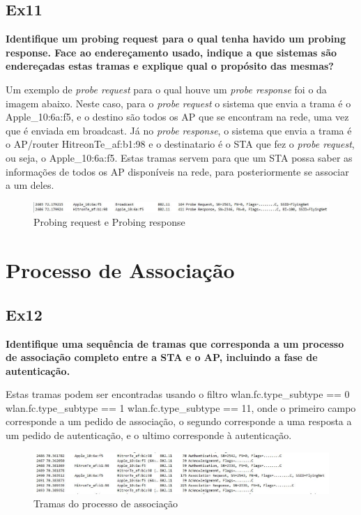 \documentclass{article}
\begin{document}
\subsection{Ex11}
\textbf{Identifique um probing request para o qual tenha havido um probing response. Face ao endereçamento usado, indique a que sistemas são endereçadas estas tramas e explique qual o propósito das mesmas?}\\\par
Um exemplo de \textit{probe request} para o qual houve um \textit{probe response} foi o da imagem abaixo. Neste caso, para o \textit{probe request} o sistema que envia a trama é o Apple\_10:6a:f5, e o destino são todos os AP que se encontram na rede, uma vez que é enviada em broadcast. Já no \textit{probe response}, o sistema que envia a trama é o AP/router HitreonTe\_af:b1:98 e o destinatario é o STA que fez o \textit{probe request}, ou seja, o Apple\_10:6a:f5. Estas tramas servem para que um STA possa saber as informações de todos os AP disponíveis na rede, para posteriormente se associar a um deles.
\begin{figure}[h]
	\centering
	\includegraphics[scale = 0.6]{ex-11.JPG}
	\caption{Probing request e Probing response}
\end{figure}

\section{Processo de Associação}
\subsection{Ex12}
\textbf{Identifique uma sequência de tramas que corresponda a um processo de associação completo entre a STA e o AP, incluindo a fase de autenticação.}\\\par
Estas tramas podem ser encontradas usando o filtro wlan.fc.type\_subtype == 0 \textbar\textbar wlan.fc.type\_subtype == 1 \textbar\textbar wlan.fc.type\_subtype == 11, onde o primeiro campo corresponde a um pedido de associação, o segundo corresponde a uma resposta a um pedido de autenticação, e o ultimo corresponde à autenticação.

\begin{figure}[h]
	\centering
	\includegraphics[scale = 0.6]{ex-12.JPG}
	\caption{Tramas do processo de associação}
\end{figure}
\end{document}
